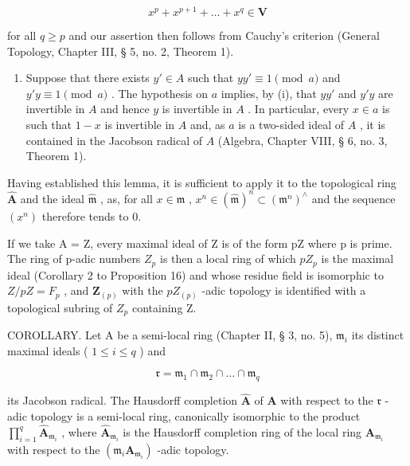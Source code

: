 \[
x ^ {p} + x ^ {p + 1} + \dots + x ^ {q} \in \mathbf {V}
\]

for all \(q \geqslant p\) and our assertion then follows from Cauchy's criterion (General Topology, Chapter III, § 5, no. 2, Theorem 1).

\begin{enumerate}
\def\labelenumi{(\roman{enumi})}
\setcounter{enumi}{1}
\tightlist
\item
  Suppose that there exists \(y' \in A\) such that \(yy' \equiv 1 \pmod{a}\) and \(y'y \equiv 1 \pmod{a}\) . The hypothesis on \(a\) implies, by (i), that \(yy'\) and \(y'y\) are invertible in \(A\) and hence \(y\) is invertible in \(A\) . In particular, every \(x \in a\) is such that \(1 - x\) is invertible in \(A\) and, as \(a\) is a two-sided ideal of \(A\) , it is contained in the Jacobson radical of \(A\) (Algebra, Chapter VIII, § 6, no. 3, Theorem 1).
\end{enumerate}

Having established this lemma, it is sufficient to apply it to the topological ring \(\hat{\mathbf{A}}\) and the ideal \(\hat{\mathfrak{m}}\) , as, for all \(x \in \hat{\mathfrak{m}}\) , \(x^n \in (\hat{\mathfrak{m}})^n \subset (\mathfrak{m}^n)^\wedge\) and the sequence \((x^n)\) therefore tends to 0.

If we take A = Z, every maximal ideal of Z is of the form pZ where p is prime. The ring of p-adic numbers \(Z_{p}\) is then a local ring of which \(pZ_{p}\) is the maximal ideal (Corollary 2 to Proposition 16) and whose residue field is isomorphic to \(Z/pZ = F_{p}\) , and \(\mathbf{Z}_{(p)}\) with the \(pZ_{(p)}\) -adic topology is identified with a topological subring of \(Z_{p}\) containing Z.

COROLLARY. Let A be a semi-local ring (Chapter II, § 3, no. 5), \(\mathfrak{m}_i\) its distinct maximal ideals ( \(1 \leqslant i \leqslant q\) ) and

\[
\mathfrak {r} = \mathfrak {m} _ {1} \cap \mathfrak {m} _ {2} \cap \dots \cap \mathfrak {m} _ {q}
\]

its Jacobson radical. The Hausdorff completion \(\hat{\mathbf{A}}\) of \(\mathbf{A}\) with respect to the \(\mathfrak{r}\) -adic topology is a semi-local ring, canonically isomorphic to the product \(\prod_{i=1}^{q} \hat{\mathbf{A}}_{\mathfrak{m}_i}\) , where \(\hat{\mathbf{A}}_{\mathfrak{m}_i}\) is the Hausdorff completion ring of the local ring \(\mathbf{A}_{\mathfrak{m}_i}\) with respect to the \((\mathfrak{m}_i\mathbf{A}_{\mathfrak{m}_i})\) -adic topology.

